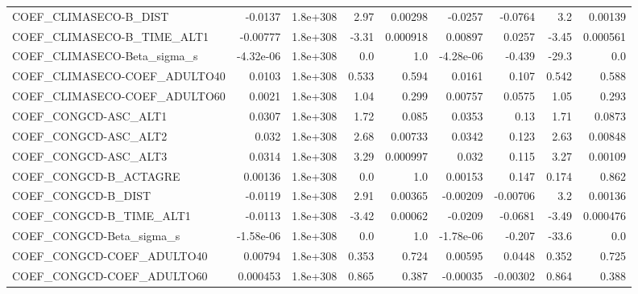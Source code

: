\begin{tabular}{lrrrrrrrr}
COEF\_CLIMASECO-B\_DIST             &     -0.0137 &     1.8e+308 &    2.97 &  0.00298 &    -0.0257 &     -0.0764 &          3.2 &       0.00139 \\
COEF\_CLIMASECO-B\_TIME\_ALT1        &    -0.00777 &     1.8e+308 &   -3.31 & 0.000918 &    0.00897 &      0.0257 &        -3.45 &      0.000561 \\
COEF\_CLIMASECO-Beta\_sigma\_s       &   -4.32e-06 &     1.8e+308 &     0.0 &      1.0 &  -4.28e-06 &      -0.439 &        -29.3 &           0.0 \\
COEF\_CLIMASECO-COEF\_ADULTO40      &      0.0103 &     1.8e+308 &   0.533 &    0.594 &     0.0161 &       0.107 &        0.542 &         0.588 \\
COEF\_CLIMASECO-COEF\_ADULTO60      &      0.0021 &     1.8e+308 &    1.04 &    0.299 &    0.00757 &      0.0575 &         1.05 &         0.293 \\
COEF\_CONGCD-ASC\_ALT1              &      0.0307 &     1.8e+308 &    1.72 &    0.085 &     0.0353 &        0.13 &         1.71 &        0.0873 \\
COEF\_CONGCD-ASC\_ALT2              &       0.032 &     1.8e+308 &    2.68 &  0.00733 &     0.0342 &       0.123 &         2.63 &       0.00848 \\
COEF\_CONGCD-ASC\_ALT3              &      0.0314 &     1.8e+308 &    3.29 & 0.000997 &      0.032 &       0.115 &         3.27 &       0.00109 \\
COEF\_CONGCD-B\_ACTAGRE             &     0.00136 &     1.8e+308 &     0.0 &      1.0 &    0.00153 &       0.147 &        0.174 &         0.862 \\
COEF\_CONGCD-B\_DIST                &     -0.0119 &     1.8e+308 &    2.91 &  0.00365 &   -0.00209 &    -0.00706 &          3.2 &       0.00136 \\
COEF\_CONGCD-B\_TIME\_ALT1           &     -0.0113 &     1.8e+308 &   -3.42 &  0.00062 &    -0.0209 &     -0.0681 &        -3.49 &      0.000476 \\
COEF\_CONGCD-Beta\_sigma\_s          &   -1.58e-06 &     1.8e+308 &     0.0 &      1.0 &  -1.78e-06 &      -0.207 &        -33.6 &           0.0 \\
COEF\_CONGCD-COEF\_ADULTO40         &     0.00794 &     1.8e+308 &   0.353 &    0.724 &    0.00595 &      0.0448 &        0.352 &         0.725 \\
COEF\_CONGCD-COEF\_ADULTO60         &    0.000453 &     1.8e+308 &   0.865 &    0.387 &   -0.00035 &    -0.00302 &        0.864 &         0.388 \\

\end{tabular}
